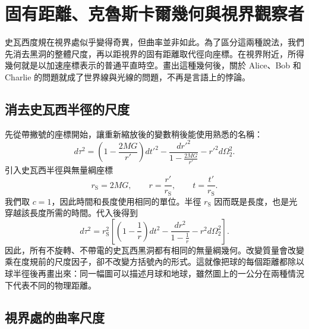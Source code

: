\chapter{固有距離、克魯斯卡爾幾何與視界觀察者}

史瓦西度規在視界處似乎變得奇異，但曲率並非如此。為了區分這兩種說法，我們先消去黑洞的整體尺度，再以距視界的固有距離取代徑向座標。在視界附近，所得幾何就是以加速座標表示的普通平直時空。畫出這種幾何後，關於 Alice、Bob 和 Charlie 的問題就成了世界線與光線的問題，不再是言語上的悖論。

\section{消去史瓦西半徑的尺度}

先從帶撇號的座標開始，讓重新縮放後的變數稍後能使用熟悉的名稱：
\begin{equation}
d\tau^2
=
\left(1-\frac{2MG}{r'}\right)dt'^2
-
\frac{dr'^2}{1-\frac{2MG}{r'}}
-
r'^2d\Omega_2^2.
\label{eq:l7-schwarzschild-dimensional}
\end{equation}
引入史瓦西半徑與無量綱座標
\begin{equation}
r_{\mathrm S}=2MG,
\qquad
r=\frac{r'}{r_{\mathrm S}},
\qquad
t=\frac{t'}{r_{\mathrm S}}.
\label{eq:l7-rescaling}
\end{equation}
我們取 \(c=1\)，因此時間和長度使用相同的單位。半徑 \(r_{\mathrm S}\) 因而既是長度，也是光穿越該長度所需的時間。代入後得到
\begin{equation}
d\tau^2
=r_{\mathrm S}^2
\left[
\left(1-\frac1r\right)dt^2
-
\frac{dr^2}{1-\frac1r}
-
r^2d\Omega_2^2
\right].
\label{eq:l7-schwarzschild-rescaled}
\end{equation}
因此，所有不旋轉、不帶電的史瓦西黑洞都有相同的無量綱幾何。改變質量會改變乘在度規前的尺度因子，卻不改變方括號內的形式。這就像把球的每個距離都除以球半徑後再畫出來：同一幅圖可以描述月球和地球，雖然圖上的一公分在兩種情況下代表不同的物理距離。

\begin{classroomqa}
\end{classroomqa}

\section{視界處的曲率尺度}

